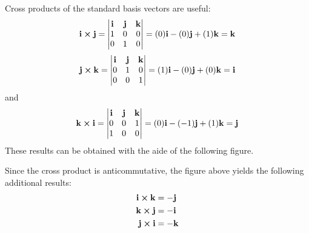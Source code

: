\documentclass[handout]{ximera}
\begin{document}
Cross products of the standard basis vectors are useful:
\[
\mathbf{i} \boldsymbol\times \mathbf{j}=
 \begin{vmatrix}
\mathbf{i} & \mathbf{j} & \mathbf{k}\\
1 & 0 & 0\\
0 & 1 & 0
\end{vmatrix}
= (0)\mathbf{i} - (0)\mathbf{j} + (1)\mathbf{k} = \mathbf{k}
\]
\[
\mathbf{j} \boldsymbol\times \mathbf{k}=
 \begin{vmatrix}
\mathbf{i} & \mathbf{j} & \mathbf{k}\\
0 & 1 & 0\\
0 & 0 & 1
\end{vmatrix}
= (1)\mathbf{i} - (0)\mathbf{j} + (0)\mathbf{k} = \mathbf{i}
\]
and
\[
\mathbf{k} \boldsymbol\times \mathbf{i}=
 \begin{vmatrix}
\mathbf{i} & \mathbf{j} & \mathbf{k}\\
0 & 0 & 1\\
1 & 0 & 0
\end{vmatrix}
= (0)\mathbf{i} - (-1)\mathbf{j} + (1)\mathbf{k} = \mathbf{j}
\]
These results can be obtained with the aide of the following figure.
\begin{image}
\end{image}

\begin{remark}
Since the cross product is anticommutative, the figure above yields the following additional results:
\begin{align*}
\mathbf{i} \boldsymbol\times \mathbf{k} &= \mathbf{-j}\\
\mathbf{k} \boldsymbol\times \mathbf{j} &= \mathbf{-i}\\
\mathbf{j} \boldsymbol\times \mathbf{i} &= \mathbf{-k}
\end{align*}
\end{remark}
\end{document}
